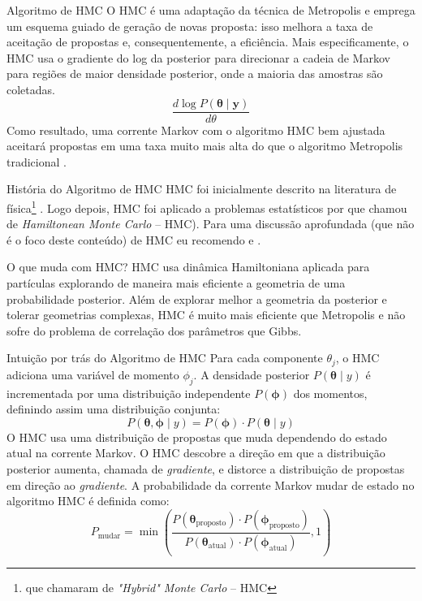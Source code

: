 \begin{frame}{Algoritmo de HMC}
  O HMC é uma adaptação da técnica de Metropolis e emprega um esquema guiado de
  geração de novas proposta: isso melhora a taxa de aceitação de propostas e,
  consequentemente, a eficiência.
  \vfill
  Mais especificamente, o HMC usa o gradiente do log da posterior para direcionar
  a cadeia de Markov para regiões de maior densidade posterior,
  onde a maioria das amostras são coletadas.
  $$
  \frac{d \log P(\boldsymbol{\theta} \mid \boldsymbol{y})}{d \theta}
  $$
  Como resultado, uma corrente Markov com o algoritmo HMC bem ajustada aceitará
  propostas em uma taxa muito mais alta do que o algoritmo Metropolis tradicional
  \parencite{robertsWeakConvergenceOptimal1997, beskosOptimalTuningHybrid2013}.
\end{frame}

\begin{frame}{História do Algoritmo de HMC}
  HMC foi inicialmente descrito na literatura de física\footnote{que chamaram de \textit{"Hybrid" Monte Carlo} -- HMC}
  \parencite{duaneHybridMonteCarlo1987}.
  \vfill
  Logo depois, HMC foi aplicado a problemas estatísticos por
  \textcite{nealImprovedAcceptanceProcedure1994} que chamou de \textit{Hamiltonean Monte Carlo}
  -- HMC).
  \vfill
  Para uma discussão aprofundada (que não é o foco deste conteúdo) de HMC eu recomendo
  \textcite{neal2011mcmc} e \textcite{betancourtConceptualIntroductionHamiltonian2017}.
\end{frame}

\begin{frame}{O que muda com HMC?}
  HMC usa dinâmica Hamiltoniana aplicada para partículas explorando de maneira mais
  eficiente a geometria de uma probabilidade posterior.
  \vfill
  Além de explorar melhor a geometria da posterior e tolerar geometrias complexas,
  HMC é muito mais eficiente que Metropolis e não sofre do problema de correlação
  dos parâmetros que Gibbs.
\end{frame}

\begin{frame}{Intuição por trás do Algoritmo de HMC}
  \small
  Para cada componente $\theta_j$, o HMC adiciona uma variável de momento
  $\phi_j$. A densidade posterior $P(\boldsymbol{\theta} \mid y)$ é incrementada
  por uma distribuição independente $P(\boldsymbol{\phi})$ dos momentos,
  definindo assim uma distribuição conjunta:
  $$
  P(\boldsymbol{\theta}, \boldsymbol{\phi} \mid y) = P(\boldsymbol{\phi}) \cdot P(\boldsymbol{\theta} \mid y)
  $$
  \small
  O HMC usa uma distribuição de propostas que muda dependendo do estado atual na
  corrente Markov. O HMC descobre a direção em que a distribuição posterior aumenta,
  chamada de \textit{gradiente}, e distorce a distribuição de propostas em
  direção ao \textit{gradiente}.
  \vfill
  A probabilidade da corrente Markov mudar de estado no algoritmo HMC é definida como:
  $$
  P_{\text{mudar}} = \min\left({\frac{P(\boldsymbol{\theta}_{\text{proposto}}) \cdot P(\boldsymbol{\phi}_{\text{proposto}})}{P(\boldsymbol{\theta}_{\text{atual}})\cdot P(\boldsymbol{\phi}_{\text{atual}})}}, 1\right)
  $$
\end{frame}

